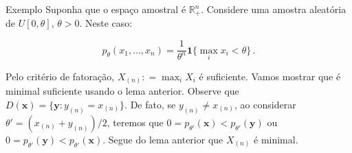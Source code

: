 \documentclass[11pt]{beamer}
\begin{document}
	\begin{frame}{Exemplo}
		Suponha que o espaço amostral é $\mathbb{R}^n_+$. Considere uma amostra aleatória de $U[0,\theta]$, $\theta > 0$.  Neste caso:
		
		$$p_\theta(x_1,\ldots, x_n) = \frac{1}{\theta^n} \mathbf{1}\{\max_i x_i < \theta\} \, .  $$
		
		Pelo critério de fatoração, $X_{(n)} : = \max_i X_i$ é suficiente. Vamos mostrar que é minimal suficiente usando o lema anterior. Observe que $D(\boldsymbol{x}) = \{\boldsymbol{y}: y_{(n)} = x_{(n)}\}$. De fato, se $y_{(n)} \neq x_{(n)}$, ao considerar $\theta' = (x_{(n)}+y_{(n)})/2$, teremos que $0 = p_{\theta'}(\boldsymbol{x}) < p_{\theta'}(\boldsymbol{y})$ ou $0 = p_{\theta'}(\boldsymbol{y}) < p_{\theta'}(\boldsymbol{x})$. Segue do lema anterior que $X_{(n)}$ é minimal.
	\end{frame}
	
\end{document}

